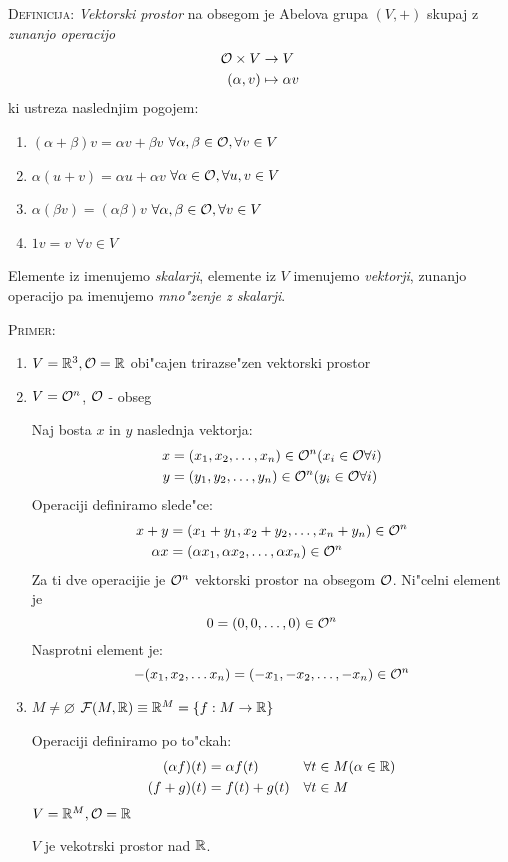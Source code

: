 \textsc{Definicija:} \emph{Vektorski prostor} na obsegom \OO je Abelova grupa $(V, +)$ skupaj z \emph{zunanjo operacijo}
\begin{align*}
\mathcal{O} \times V &\to V \\
(\alpha, v) &\mapsto \alpha v
\end{align*}
ki ustreza naslednjim pogojem:
\begin{enumerate}
	\item $(\alpha + \beta) v = \alpha v + \beta v$ \hfill $\forall \alpha, \beta \in \mathcal{O}, \forall v \in V$
	\item $\alpha(u + v) = \alpha u + \alpha v$ \hfill $\forall \alpha \in \mathcal{O}, \forall u, v \in V$
	\item $\alpha(\beta v) = (\alpha \beta)v$ \hfill $\forall \alpha, \beta \in \mathcal{O}, \forall v \in V$
	\item $1v = v$ \hfill $\forall v \in V$
\end{enumerate}
Elemente iz \OO imenujemo \emph{skalarji}, elemente iz $V$ imenujemo \emph{vektorji}, zunanjo operacijo pa imenujemo \emph{mno"zenje z skalarji}.

\textsc{Primer:}
\begin{enumerate}[(1)]
	\item $V = \mathbb{R}^3, \mathcal{O} = \mathbb{R}$ obi"cajen trirazse"zen vektorski prostor
	\item $V = \mathcal{O}^n$, $\mathcal{O}$ - obseg
	
	Naj bosta $x$ in $y$ naslednja vektorja:
	\begin{align*}
	x &= (x_1, x_2, \ldots, x_n) \in \mathcal{O}^n (x_i \in \mathcal{O} \forall i) \\
	y &= (y_1, y_2, \ldots, y_n) \in \mathcal{O}^n (y_i \in \mathcal{O} \forall i)
	\end{align*}
	Operaciji definiramo slede"ce:
	\begin{align*}
	x + y &= (x_1 + y_1, x_2 + y_2, \ldots, x_n + y_n) \in \mathcal{O}^n \\
	\alpha x &= (\alpha x_1, \alpha x_2, \ldots, \alpha x_n) \in \mathcal{O}^n
	\end{align*}
	Za ti dve operacijie je $\mathcal{O}^n$ vektorski prostor na obsegom $\mathcal{O}$. Ni"celni element je
	\begin{equation*}
	0 = (0, 0, \ldots, 0) \in \mathcal{O}^n
	\end{equation*}
	Nasprotni element je:
	\begin{equation*}
	-(x_1, x_2, \ldots x_n) = (-x_1, -x_2, \ldots, -x_n) \in \mathcal{O}^n
	\end{equation*}
	
	\item $M \neq \varnothing$ \qquad $\mathcal{F}(M, \mathbb{R}) \equiv \mathbb{R}^M = \{f: M \to \mathbb{R}\}$
	
	Operaciji definiramo po to"ckah:
	\begin{align*}
	(\alpha f)(t) &= \alpha f(t) && \forall t \in M (\alpha \in \mathbb{R}) \\
	(f + g)(t) &= f(t) + g(t) && \forall t \in M
	\end{align*}
	$V = \mathbb{R}^M, \mathcal{O} = \mathbb{R}$
	
	$V$ je vekotrski prostor nad $\mathbb{R}$.
\end{enumerate}
